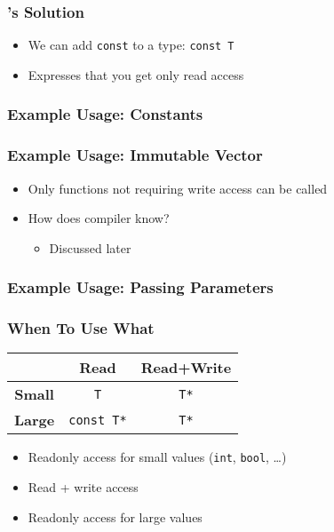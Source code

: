 \begin{frame}
  \frametitle{\cpp's Solution}
  \begin{itemize}
    \item We can add \texttt{const} to a type: \texttt{const T}
    \item Expresses that you get only read access
  \end{itemize}
  \vskip5mm
\end{frame}

\begin{frame}
  \frametitle{Example Usage: Constants}
\end{frame}

\begin{frame}
  \frametitle{Example Usage: Immutable Vector}
  \begin{itemize}
    \item Only functions not requiring write access can be called
    \item How does compiler know?
          \begin{itemize}
            \item Discussed later
          \end{itemize}
  \end{itemize}
\end{frame}

\begin{frame}
  \frametitle{Example Usage: Passing Parameters}
\end{frame}

\begin{frame}
  \frametitle{When To Use What}
  \begin{center}
    \begin{tabular}{ccc}
      & \textbf{Read} & \textbf{Read+Write} \\
      \toprule
      \textbf{Small} & \texttt{T} & \texttt{T*} \\
      \textbf{Large} & \texttt{const T*} & \texttt{T*} \\
    \end{tabular}
  \end{center}
  \begin{itemize}
    \item Readonly access for small values (\texttt{int}, \texttt{bool}, \dots)
  \end{itemize}
  \vskip2mm
  \begin{itemize}
    \item Read + write access
  \end{itemize}
  \vskip2mm
  \begin{itemize}
    \item Readonly access for large values
  \end{itemize}
\end{frame}

